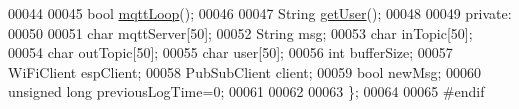 \begin{DoxyCode}
00044 
00045     \textcolor{keywordtype}{bool} \hyperlink{class_cool_m_q_t_t_aa5eaae967b562b62cbcf2b8d81f6e5d5}{mqttLoop}();
00046 
00047     String \hyperlink{class_cool_m_q_t_t_a373cc92fca7760d886f02d8a6e5b3f63}{getUser}();
00048 
00049 \textcolor{keyword}{private}:
00050     
00051     \textcolor{keywordtype}{char} mqttServer[50];
00052     String msg;
00053     \textcolor{keywordtype}{char} inTopic[50];
00054     \textcolor{keywordtype}{char} outTopic[50];
00055     \textcolor{keywordtype}{char} user[50];
00056     \textcolor{keywordtype}{int} bufferSize; 
00057     WiFiClient espClient;
00058     PubSubClient client;
00059     \textcolor{keywordtype}{bool} newMsg;
00060     \textcolor{keywordtype}{unsigned} \textcolor{keywordtype}{long} previousLogTime=0;
00061 
00062 
00063 \};
00064 
00065 \textcolor{preprocessor}{#endif}
\end{DoxyCode}

